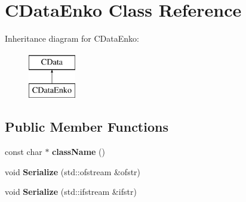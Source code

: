 \hypertarget{classCDataEnko}{\section{C\-Data\-Enko Class Reference}
\label{classCDataEnko}
}
Inheritance diagram for C\-Data\-Enko\-:\begin{figure}[H]
\begin{center}
\leavevmode
\includegraphics[height=2.000000cm]{classCDataEnko}
\end{center}
\end{figure}
\subsection*{Public Member Functions}
\begin{DoxyCompactItemize}
\item 
\hypertarget{classCDataEnko_ae38a76099260e0a0a44e29e5016cfa28}{const char $\ast$ {\bfseries class\-Name} ()}\label{classCDataEnko_ae38a76099260e0a0a44e29e5016cfa28}

\item 
\hypertarget{classCDataEnko_a3541a8022f27c4b4daa8d3b6dfafdfe8}{void {\bfseries Serialize} (std\-::ofstream \&ofstr)}\label{classCDataEnko_a3541a8022f27c4b4daa8d3b6dfafdfe8}

\item 
\hypertarget{classCDataEnko_a07bef4e4718f56989441444a90025183}{void {\bfseries Serialize} (std\-::ifstream \&ifstr)}\label{classCDataEnko_a07bef4e4718f56989441444a90025183}

\end{DoxyCompactItemize}

